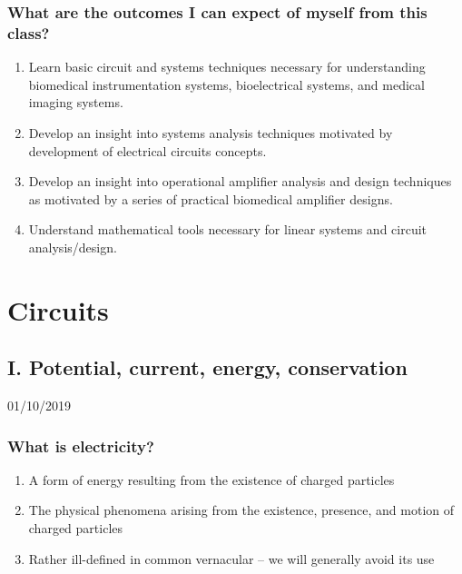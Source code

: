 \documentclass[11pt]{book}
\begin{document}
\section{What are the outcomes I can expect of myself from this class?}
\begin{enumerate}
	\item Learn basic circuit and systems techniques necessary for understanding biomedical instrumentation systems, bioelectrical systems, and medical imaging systems.
	\item Develop an insight into systems analysis techniques motivated by development of electrical circuits concepts.
	\item Develop an insight into operational amplifier analysis and design techniques as motivated by a series of practical biomedical amplifier designs.
	\item Understand mathematical tools necessary for linear systems and circuit analysis/design.
\end{enumerate}



\mainmatter
\setcounter{page}{1}



\part{Circuits}



\chapter{I. Potential, current, energy, conservation}
01/10/2019
\minitoc



\section{What is electricity?}

\begin{enumerate}
	\item A form of energy resulting from the existence of charged particles 
	\item The physical phenomena arising from the existence, presence, and motion of charged particles
	\item Rather ill-defined in common vernacular – we will generally avoid its use
\end{enumerate}
\end{document}
